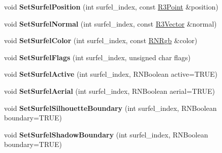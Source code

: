 \begin{DoxyCompactItemize}
\item 
void {\bfseries Set\+Surfel\+Position} (int surfel\+\_\+index, const \hyperlink{class_r3_point}{R3\+Point} \&position)\hypertarget{class_r3_surfel_block_aed79ff3e1143bcef90b031c25ac37791}{}\label{class_r3_surfel_block_aed79ff3e1143bcef90b031c25ac37791}

\item 
void {\bfseries Set\+Surfel\+Normal} (int surfel\+\_\+index, const \hyperlink{class_r3_vector}{R3\+Vector} \&normal)\hypertarget{class_r3_surfel_block_ae3d27b89ae0ec6a7c860411d951de008}{}\label{class_r3_surfel_block_ae3d27b89ae0ec6a7c860411d951de008}

\item 
void {\bfseries Set\+Surfel\+Color} (int surfel\+\_\+index, const \hyperlink{class_r_n_rgb}{R\+N\+Rgb} \&color)\hypertarget{class_r3_surfel_block_afb836379d4e3d4156d6bb55c5b5447ce}{}\label{class_r3_surfel_block_afb836379d4e3d4156d6bb55c5b5447ce}

\item 
void {\bfseries Set\+Surfel\+Flags} (int surfel\+\_\+index, unsigned char flags)\hypertarget{class_r3_surfel_block_a8d4ac8fbb82b3db8a54a34d4ae010731}{}\label{class_r3_surfel_block_a8d4ac8fbb82b3db8a54a34d4ae010731}

\item 
void {\bfseries Set\+Surfel\+Active} (int surfel\+\_\+index, R\+N\+Boolean active=T\+R\+UE)\hypertarget{class_r3_surfel_block_a2a21b5b9fa562fdc9beac71622fc243e}{}\label{class_r3_surfel_block_a2a21b5b9fa562fdc9beac71622fc243e}

\item 
void {\bfseries Set\+Surfel\+Aerial} (int surfel\+\_\+index, R\+N\+Boolean aerial=T\+R\+UE)\hypertarget{class_r3_surfel_block_a155e7dccbcb896006ac651648978dd5e}{}\label{class_r3_surfel_block_a155e7dccbcb896006ac651648978dd5e}

\item 
void {\bfseries Set\+Surfel\+Silhouette\+Boundary} (int surfel\+\_\+index, R\+N\+Boolean boundary=T\+R\+UE)\hypertarget{class_r3_surfel_block_a5c9dfca143789752b57059a2d6758968}{}\label{class_r3_surfel_block_a5c9dfca143789752b57059a2d6758968}

\item 
void {\bfseries Set\+Surfel\+Shadow\+Boundary} (int surfel\+\_\+index, R\+N\+Boolean boundary=T\+R\+UE)\hypertarget{class_r3_surfel_block_a3a5fc80977ccf1dfab47fc8734257ba5}{}\label{class_r3_surfel_block_a3a5fc80977ccf1dfab47fc8734257ba5}


\end{DoxyCompactItemize}
